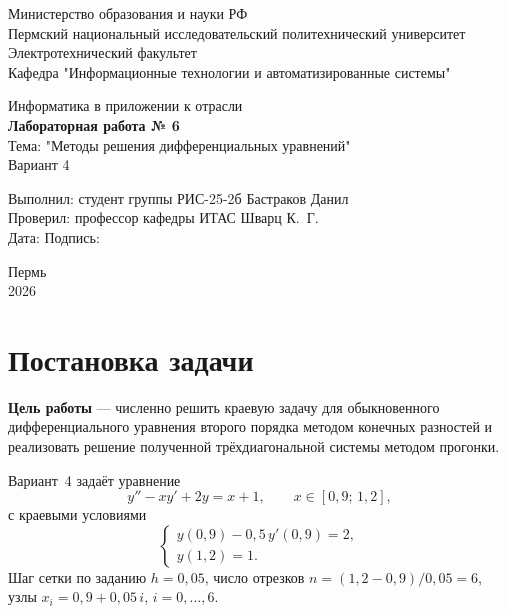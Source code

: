 \documentclass[14pt,a4paper]{extarticle}
\begin{document}
\begin{titlepage}
    \centering
    \large
    Министерство образования и науки РФ\\[0.3cm]
    Пермский национальный исследовательский политехнический университет\\[0.3cm]
    Электротехнический факультет\\[0.3cm]
    Кафедра "Информационные технологии и автоматизированные системы"

    \vspace{3.5cm}
    {\Large Информатика в приложении к отрасли}\\[0.4cm]
    {\Large\bfseries Лабораторная работа № 6}\\[0.6cm]

    Тема: "Методы решения дифференциальных уравнений"\\[0.2cm]
    Вариант 4

    \vspace{4.5cm}
    \begin{flushleft}
        \large
        Выполнил: студент группы РИС-25-2б \hfill Бастраков Данил\\[0.5cm]
        Проверил: профессор кафедры ИТАС \hfill Шварц К.~Г.\\[0.5cm]
        Дата: \underline{\hspace{3cm}} \hfill Подпись: \underline{\hspace{4cm}}
    \end{flushleft}

    \vfill
    Пермь\\ 2026
\end{titlepage}

\tableofcontents
\newpage

\section{Постановка задачи}

\textbf{Цель работы} --- численно решить краевую задачу для обыкновенного
дифференциального уравнения второго порядка методом конечных разностей
и реализовать решение полученной трёхдиагональной системы методом прогонки.

Вариант~4 задаёт уравнение
\begin{equation}
    y'' - x y' + 2y = x + 1, \qquad x \in [0{,}9;\, 1{,}2],
    \label{eq:ode}
\end{equation}
с краевыми условиями
\begin{equation}
    \begin{cases}
        y(0{,}9) - 0{,}5\,y'(0{,}9) = 2,\\
        y(1{,}2) = 1.
    \end{cases}
    \label{eq:bc}
\end{equation}
Шаг сетки по заданию $h=0{,}05$, число отрезков
$n=(1{,}2-0{,}9)/0{,}05=6$, узлы $x_i=0{,}9+0{,}05\,i$, $i=0,\ldots,6$.
\end{document}
